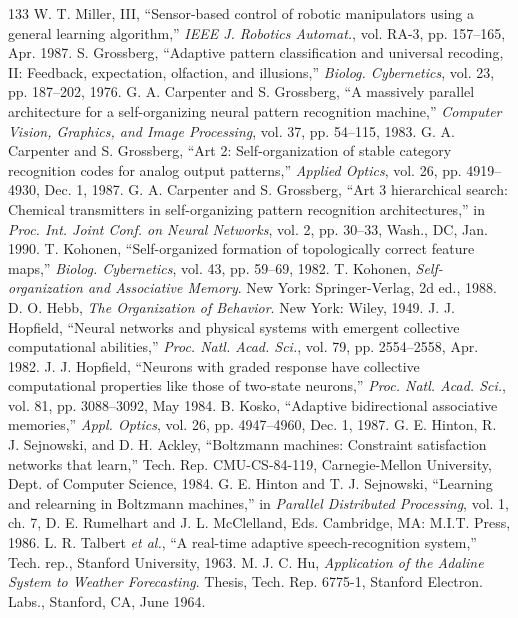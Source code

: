 \documentclass[10pt,twocolumn]{article}
\begin{document}
\begin{thebibliography}{133}
 W. T. Miller, III, ``Sensor-based control of robotic manipulators using a general learning algorithm,'' \textit{IEEE J. Robotics Automat.}, vol. RA-3, pp. 157--165, Apr. 1987.
 S. Grossberg, ``Adaptive pattern classification and universal recoding, II: Feedback, expectation, olfaction, and illusions,'' \textit{Biolog. Cybernetics}, vol. 23, pp. 187--202, 1976.
 G. A. Carpenter and S. Grossberg, ``A massively parallel architecture for a self-organizing neural pattern recognition machine,'' \textit{Computer Vision, Graphics, and Image Processing}, vol. 37, pp. 54--115, 1983.
 G. A. Carpenter and S. Grossberg, ``Art 2: Self-organization of stable category recognition codes for analog output patterns,'' \textit{Applied Optics}, vol. 26, pp. 4919--4930, Dec. 1, 1987.
 G. A. Carpenter and S. Grossberg, ``Art 3 hierarchical search: Chemical transmitters in self-organizing pattern recognition architectures,'' in \textit{Proc. Int. Joint Conf. on Neural Networks}, vol. 2, pp. 30--33, Wash., DC, Jan. 1990.
 T. Kohonen, ``Self-organized formation of topologically correct feature maps,'' \textit{Biolog. Cybernetics}, vol. 43, pp. 59--69, 1982.
 T. Kohonen, \textit{Self-organization and Associative Memory}. New York: Springer-Verlag, 2d ed., 1988.
 D. O. Hebb, \textit{The Organization of Behavior}. New York: Wiley, 1949.
 J. J. Hopfield, ``Neural networks and physical systems with emergent collective computational abilities,'' \textit{Proc. Natl. Acad. Sci.}, vol. 79, pp. 2554--2558, Apr. 1982.
 J. J. Hopfield, ``Neurons with graded response have collective computational properties like those of two-state neurons,'' \textit{Proc. Natl. Acad. Sci.}, vol. 81, pp. 3088--3092, May 1984.
 B. Kosko, ``Adaptive bidirectional associative memories,'' \textit{Appl. Optics}, vol. 26, pp. 4947--4960, Dec. 1, 1987.
 G. E. Hinton, R. J. Sejnowski, and D. H. Ackley, ``Boltzmann machines: Constraint satisfaction networks that learn,'' Tech. Rep. CMU-CS-84-119, Carnegie-Mellon University, Dept. of Computer Science, 1984.
 G. E. Hinton and T. J. Sejnowski, ``Learning and relearning in Boltzmann machines,'' in \textit{Parallel Distributed Processing}, vol. 1, ch. 7, D. E. Rumelhart and J. L. McClelland, Eds. Cambridge, MA: M.I.T. Press, 1986.
 L. R. Talbert \textit{et al.}, ``A real-time adaptive speech-recognition system,'' Tech. rep., Stanford University, 1963.
 M. J. C. Hu, \textit{Application of the Adaline System to Weather Forecasting}. Thesis, Tech. Rep. 6775-1, Stanford Electron. Labs., Stanford, CA, June 1964.

\end{thebibliography}
\end{document}
